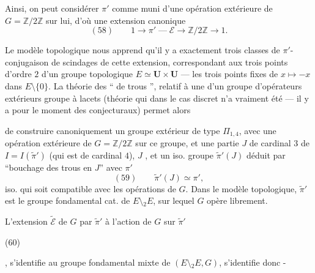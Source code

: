 Ainsi, on peut considérer $\pi'$ comme muni 
d'une  opération extérieure de
$G=\mathbb Z/2\mathbb Z$ sur lui, d'où une extension
canonique
\[
(58)\qquad 1\longrightarrow\pi'\mathrel{\text{---}}\mathcal E\longrightarrow\mathbb Z/2\mathbb Z\longrightarrow1.
\]

Le modèle topologique nous apprend
qu'il y a exactement trois classes de $\pi'$-
conjugaison de scindages de cette
extension, correspondant aux trois
points d'ordre $2$ d'un groupe topologique
$E\simeq\mathbf U\times\mathbf U$ --- les trois points fixes de
$x\mapsto-x$ dans $E\setminus\{0\}$. La théorie des
`` de trous '', relatif à une
 d'un groupe  d'opérateurs extérieurs
 groupe à lacets (théorie qui
 dans le cas discret n'a vraiment
été  --- il y a pour le moment des
 conjecturaux) permet alors


de construire canoniquement un groupe extérieur  de type $\Pi_{1,4}$, avec une opération extérieure de $G=\mathbb Z/2\mathbb Z$ sur ce groupe, et une partie $J$  de cardinal $3$ de $I=I(\widetilde{\pi}')$ (qui est de cardinal $4$), $J$ , et un iso.  groupe $\widetilde{\pi}'(J)$  déduit par ``bouchage des trous en $J$'' avec $\pi'$
\[
(59)\qquad \widetilde{\pi}'(J)\simeq\pi',
\]
iso. qui soit compatible avec les opérations de $G$. Dans le modèle topologique, $\widetilde{\pi}'$ est le groupe fondamental cat. de  $E\setminus {}_2E$,  sur lequel $G$ opère librement.


L'extension $\widetilde{\mathcal E}$ de $G$ par $\widetilde{\pi}'$  à l'action de  $G$ sur $\widetilde{\pi}'$
\begin{samepage}
\noindent (60)\quad
{}
\end{samepage},
 s'identifie  au groupe fondamental mixte de $(E\setminus {}_2E,G)$, s'identifie donc -

